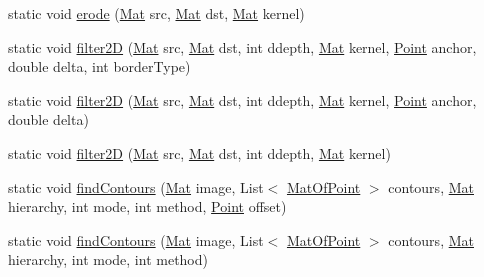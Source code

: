 \begin{DoxyCompactItemize}
\item 
static void \mbox{\hyperlink{classorg_1_1opencv_1_1imgproc_1_1_imgproc_a485bdd85e47f631bd9f2e29d203b4060}{erode}} (\mbox{\hyperlink{classorg_1_1opencv_1_1core_1_1_mat}{Mat}} src, \mbox{\hyperlink{classorg_1_1opencv_1_1core_1_1_mat}{Mat}} dst, \mbox{\hyperlink{classorg_1_1opencv_1_1core_1_1_mat}{Mat}} kernel)
\item 
static void \mbox{\hyperlink{classorg_1_1opencv_1_1imgproc_1_1_imgproc_af8d713c4327b7458705f063ad4fa83e5}{filter2D}} (\mbox{\hyperlink{classorg_1_1opencv_1_1core_1_1_mat}{Mat}} src, \mbox{\hyperlink{classorg_1_1opencv_1_1core_1_1_mat}{Mat}} dst, int ddepth, \mbox{\hyperlink{classorg_1_1opencv_1_1core_1_1_mat}{Mat}} kernel, \mbox{\hyperlink{classorg_1_1opencv_1_1core_1_1_point}{Point}} anchor, double delta, int border\+Type)
\item 
static void \mbox{\hyperlink{classorg_1_1opencv_1_1imgproc_1_1_imgproc_a99d049df474881b0f663137cac0e83db}{filter2D}} (\mbox{\hyperlink{classorg_1_1opencv_1_1core_1_1_mat}{Mat}} src, \mbox{\hyperlink{classorg_1_1opencv_1_1core_1_1_mat}{Mat}} dst, int ddepth, \mbox{\hyperlink{classorg_1_1opencv_1_1core_1_1_mat}{Mat}} kernel, \mbox{\hyperlink{classorg_1_1opencv_1_1core_1_1_point}{Point}} anchor, double delta)
\item 
static void \mbox{\hyperlink{classorg_1_1opencv_1_1imgproc_1_1_imgproc_a957d2e1b7b47980406f42d1290385504}{filter2D}} (\mbox{\hyperlink{classorg_1_1opencv_1_1core_1_1_mat}{Mat}} src, \mbox{\hyperlink{classorg_1_1opencv_1_1core_1_1_mat}{Mat}} dst, int ddepth, \mbox{\hyperlink{classorg_1_1opencv_1_1core_1_1_mat}{Mat}} kernel)
\item 
static void \mbox{\hyperlink{classorg_1_1opencv_1_1imgproc_1_1_imgproc_a60284da5baddfe0b44c6553177de8bf9}{find\+Contours}} (\mbox{\hyperlink{classorg_1_1opencv_1_1core_1_1_mat}{Mat}} image, List$<$ \mbox{\hyperlink{classorg_1_1opencv_1_1core_1_1_mat_of_point}{Mat\+Of\+Point}} $>$ contours, \mbox{\hyperlink{classorg_1_1opencv_1_1core_1_1_mat}{Mat}} hierarchy, int mode, int method, \mbox{\hyperlink{classorg_1_1opencv_1_1core_1_1_point}{Point}} offset)
\item 
static void \mbox{\hyperlink{classorg_1_1opencv_1_1imgproc_1_1_imgproc_a007342d8043f1610bb73d105949ab86c}{find\+Contours}} (\mbox{\hyperlink{classorg_1_1opencv_1_1core_1_1_mat}{Mat}} image, List$<$ \mbox{\hyperlink{classorg_1_1opencv_1_1core_1_1_mat_of_point}{Mat\+Of\+Point}} $>$ contours, \mbox{\hyperlink{classorg_1_1opencv_1_1core_1_1_mat}{Mat}} hierarchy, int mode, int method)
\item 

\end{DoxyCompactItemize}
